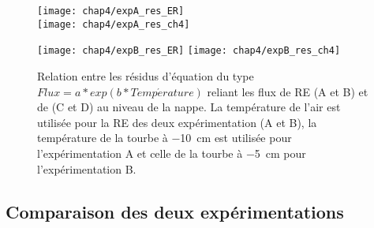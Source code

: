 \begin{figure}[!tbp]
\centering
\hspace*{-2cm}
\begin{minipage}[]{.55\textwidth}
\texttt{[image: chap4/expA\_res\_ER]}\\
\texttt{[image: chap4/expA\_res\_ch4]}
\end{minipage}
\hspace*{.1cm}
\begin{minipage}[]{.55\textwidth}
\texttt{[image: chap4/expB\_res\_ER]}
\texttt{[image: chap4/expB\_res\_ch4]}
\end{minipage}
\hspace*{-2cm}
\caption{Relation entre les résidus d'équation du type $Flux=a*exp(b*Temp\acute{e}rature) $ reliant les flux de RE (A et B) et de \chh (C et D) au niveau de la nappe. La température de l'air est utilisée pour la RE des deux expérimentation (A et B), la température de la tourbe à \SI{-10}{\centi\metre} est utilisée pour l'expérimentation A et celle de la tourbe à \SI{-5}{\centi\metre} pour l'expérimentation B.}
\label{fig:HM_res}
\end{figure}


\subsection{Comparaison des deux expérimentations}

